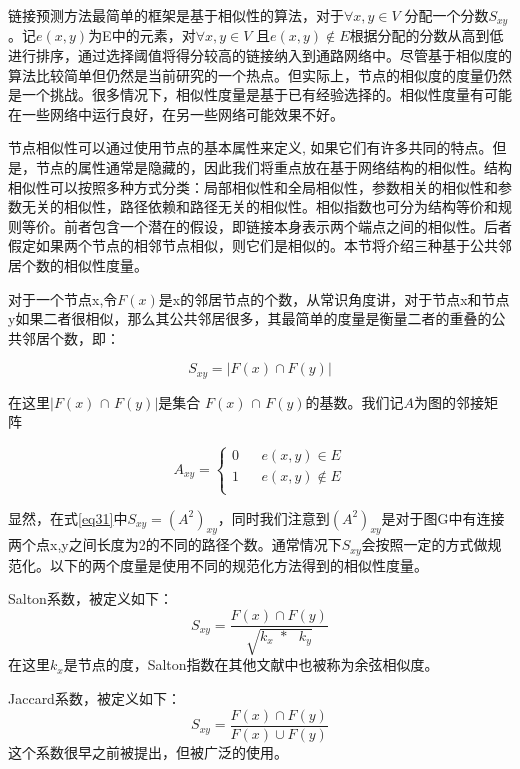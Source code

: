 链接预测方法最简单的框架是基于相似性的算法，对于$\forall x,y\in V$ 分配一个分数$S_{xy}$。记$e(x,y)$为E中的元素，对$\forall x,y\in V$ 且$e(x,y) \notin E$根据分配的分数从高到低进行排序，通过选择阈值将得分较高的链接纳入到通路网络中。尽管基于相似度的算法比较简单但仍然是当前研究的一个热点。但实际上，节点的相似度的度量仍然是一个挑战。很多情况下，相似性度量是基于已有经验选择的。相似性度量有可能在一些网络中运行良好，在另一些网络可能效果不好\cite{lu2011link}。

节点相似性可以通过使用节点的基本属性来定义, 如果它们有许多共同的特点。但是，节点的属性通常是隐藏的，因此我们将重点放在基于网络结构的相似性。结构相似性可以按照多种方式分类：局部相似性和全局相似性，参数相关的相似性和参数无关的相似性，路径依赖和路径无关的相似性。相似指数也可分为结构等价和规则等价。前者包含一个潜在的假设，即链接本身表示两个端点之间的相似性。后者假定如果两个节点的相邻节点相似，则它们是相似的。本节将介绍三种基于公共邻居个数的相似性度量。

对于一个节点x,令$F(x)$是x的邻居节点的个数，从常识角度讲，对于节点x和节点y如果二者很相似，那么其公共邻居很多，其最简单的度量是衡量二者的重叠的公共邻居个数，即：

\begin{equation}
	S_{xy} = |F(x) \cap F(y)|
	\label{eq31}
\end{equation}

在这里$|F(x)$ $\cap$ $F(y)|$是集合  $F(x)$ $\cap$ $F(y)$的基数。我们记$A$为图的邻接矩阵

\begin{equation}
  A_{xy}=\left\{
 \begin{array}{rcl}
 0      &      & {e(x,y) \in E}\\
 1      &      & {e(x,y) \notin E}\\
 \end{array} \right. 
\end{equation}

显然，在式\ref{eq31}中$S_{xy}=(A^2)_{xy}$，同时我们注意到$(A^2)_{xy}$是对于图G中有连接两个点x,y之间长度为2的不同的路径个数。通常情况下$S_{xy}$会按照一定的方式做规范化。以下的两个度量是使用不同的规范化方法得到的相似性度量。

Salton系数，被定义如下：
\begin{equation}
S_{xy} =\frac{F( x) \cap F( y)}{\sqrt{k_{x\ \ } *\ \ \ k_{y}}}
\end{equation}
在这里$k_{x}$是节点的度，Salton指数在其他文献中也被称为余弦相似度。

Jaccard系数，被定义如下：
\begin{equation}
S_{xy} =\frac{F( x) \cap F( y)}{F( x) \cup F( y)}
\end{equation}
这个系数很早之前被提出，但被广泛的使用。

